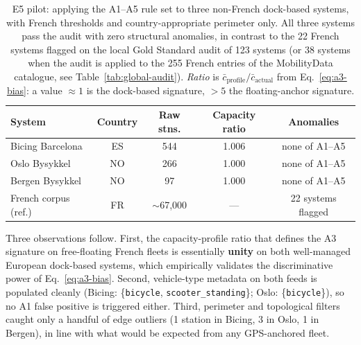 \documentclass[11pt,a4paper]{article}
\begin{document}
\begin{table}[ht]
\centering
\caption{E5 pilot: applying the A1--A5 rule set to three non-French
dock-based systems, with French thresholds and country-appropriate
perimeter only. All three systems pass the audit with zero structural
anomalies, in contrast to the 22 French systems flagged on the local
Gold Standard audit of 123 systems (or 38 systems when the audit is
applied to the 255 French entries of the MobilityData catalogue, see
Table~\ref{tab:global-audit}). \emph{Ratio} is $\bar c_{\text{profile}} / \bar c_{\text{actual}}$
from Eq.~\ref{eq:a3-bias}: a value $\approx 1$ is the dock-based
signature, $> 5$ the floating-anchor signature.}
\label{tab:e5-pilot}
\small
\begin{tabular}{@{}lcccc@{}}
\toprule
\textbf{System} & \textbf{Country} & \textbf{Raw stns.}
                & \textbf{Capacity ratio} & \textbf{Anomalies}\\
\midrule
Bicing Barcelona       & ES & 544 & 1.006 & none of A1--A5 \\
Oslo Bysykkel          & NO & 266 & 1.000 & none of A1--A5 \\
Bergen Bysykkel        & NO &  97 & 1.000 & none of A1--A5 \\
\midrule
French corpus (ref.)   & FR & $\sim$67{,}000 & --- & 22 systems flagged \\
\bottomrule
\end{tabular}
\end{table}

Three observations follow. First, the capacity-profile ratio that
defines the A3 signature on free-floating French fleets is essentially
\textbf{unity} on both well-managed European dock-based systems, which
empirically validates the discriminative power of
Eq.~\ref{eq:a3-bias}. Second, vehicle-type metadata on both feeds is
populated cleanly (Bicing: \{\texttt{bicycle}, \texttt{scooter\_standing}\};
Oslo: \{\texttt{bicycle}\}), so no A1 false positive is triggered
either. Third, perimeter and topological filters caught only a
handful of edge outliers (1 station in Bicing, 3 in Oslo, 1 in Bergen), in line
with what would be expected from any GPS-anchored fleet.
\end{document}
